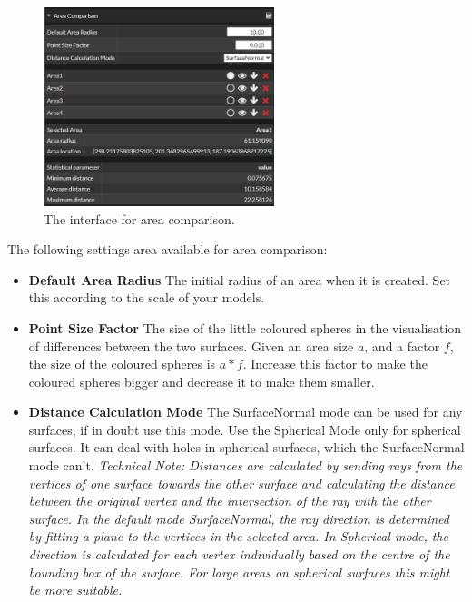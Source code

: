 \begin{figure}[h]
	\centering
	\includegraphics[width=0.6\textwidth]{pics/surfaceComparisonAreaGui.PNG}
	\caption[The interface for area comparison.]{The interface for area comparison.}
	\label{fig:surfaceComparisonAreaGui}
\end{figure}

The following settings area available for area comparison:

\begin{itemize}
	\item \textbf{Default Area Radius} The initial radius of an area when it is created. Set this according to the scale of your models.
	\item \textbf{Point Size Factor} The size of the little coloured spheres in the visualisation of differences between the two surfaces. Given an area size $a$, and a factor $f$, the size of the coloured spheres is $a * f$. Increase this factor to make the coloured spheres bigger and decrease it to make them smaller.
	\item \textbf{Distance Calculation Mode} The SurfaceNormal mode can be used for any surfaces, if in doubt use this mode. Use the Spherical Mode only for spherical surfaces. It can deal with holes in spherical surfaces, which the SurfaceNormal mode can't. \emph{Technical Note: Distances are calculated by sending rays from the vertices of one surface towards the other surface and calculating the distance between the original vertex and the intersection of the ray with the other surface. In the default mode \emph{SurfaceNormal}, the ray direction is determined by fitting a plane to the vertices in the selected area. In Spherical mode, the direction is calculated for each vertex individually based on the centre of the bounding box of the surface. For large areas on spherical surfaces this might be more suitable.}
\end{itemize}


